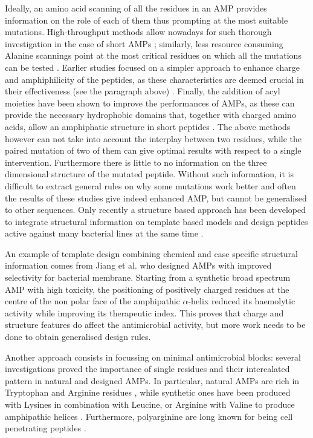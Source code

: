 Ideally, an amino acid scanning of all the residues in an AMP provides information on the role of each of them thus prompting at the most suitable mutations. High-throughput methods allow nowadays for such thorough investigation in the case of short AMPs \cite{Hilpert2005,Hilpert2006}; similarly, less resource consuming Alanine scannings point at the most critical residues on which all the mutations can be tested \cite{Migon2018,Grieco2011,Xie2018}.
%
Earlier studies focused on a simpler approach to enhance charge and amphiphilicity of the peptides, as these characteristics are deemed crucial in their effectiveness (see the paragraph above) \cite{Wiradharma2011,Huang2010,Pag2008,Wang2015}.
%
Finally, the addition of acyl moieties have been shown to improve the performances of AMPs, as these can provide the necessary hydrophobic domains that, together with charged amino acids, allow an amphiphatic structure in short pep­tides \cite{Radzishevsky2005,Serrano2009,Avrahami2004}.
%
The above methods however can not take into account the interplay between two residues, while the paired mutation of two of them can give optimal results with respect to a single intervention. Furthermore
there is little to no information on the three dimensional structure of the mutated peptide. Without such information, it is difficult to extract general rules on why some mutations work better and often the results of these studies give indeed enhanced AMP, but cannot be generalised to other sequences.
%
Only recently a structure based approach has been developed to integrate structural information on template based models and design peptides active against many bacterial lines at the same time \cite{Liu2018}.

An example of template design combining chemical and case specific structural information comes from Jiang et al. \cite{Jiang2011} who designed AMPs with improved selectivity for bacterial membrane. Starting from a synthetic broad spectrum AMP with high toxicity, the positioning of positively charged residues at the centre of the non ­polar face of the amphipathic $\alpha$-helix reduced its haemolytic activity while improving its therapeutic index. This proves that charge and structure features do affect the antimicrobial activity, but more work needs to be done to obtain generalised design rules.

Another approach consists in focussing on minimal antimicrobial blocks: several investigations proved the importance of single residues and their intercalated pattern in natural and designed AMPs. In particular, natural AMPs are rich in Tryptophan and Arginine residues \cite{Chan2006}, while synthetic ones have been produced with Lysines in combination with Leucine, or Arginine with Valine to produce amphi­pathic helices \cite{Deslouches2005}. Furthermore, polyarginine are long known for being cell penetrating peptides \cite{Schmidt2010}.

